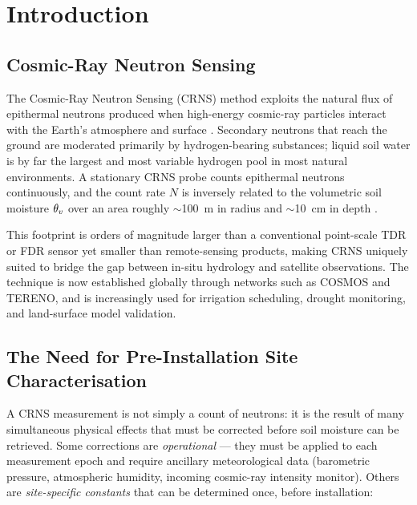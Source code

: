 \section{Introduction}

\subsection{Cosmic-Ray Neutron Sensing}

The Cosmic-Ray Neutron Sensing (CRNS) method exploits the natural
flux of epithermal neutrons produced when high-energy cosmic-ray
particles interact with the Earth's atmosphere and surface
\citep{zreda2012}.
Secondary neutrons that reach the ground are moderated primarily by
hydrogen-bearing substances; liquid soil water is by far the largest
and most variable hydrogen pool in most natural environments.
A stationary CRNS probe counts epithermal neutrons continuously, and
the count rate $N$ is inversely related to the volumetric soil moisture
$\theta_v$ over an area roughly $\sim$\SI{100}{\metre} in radius and
$\sim$\SI{10}{\centi\metre} in depth \citep{desilets2010, kohli2015}.

This footprint is orders of magnitude larger than a conventional
point-scale TDR or FDR sensor yet smaller than remote-sensing products,
making CRNS uniquely suited to bridge the gap between in-situ
hydrology and satellite observations.
The technique is now established globally through networks such as
COSMOS \citep{zreda2012} and TERENO, and is increasingly used for
irrigation scheduling, drought monitoring, and land-surface model
validation.

\subsection{The Need for Pre-Installation Site Characterisation}

A CRNS measurement is not simply a count of neutrons: it is the
result of many simultaneous physical effects that must be corrected
before soil moisture can be retrieved.
Some corrections are \emph{operational} — they must be applied to
each measurement epoch and require ancillary meteorological data
(barometric pressure, atmospheric humidity, incoming cosmic-ray
intensity monitor).
Others are \emph{site-specific constants} that can be determined
once, before installation:

